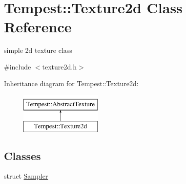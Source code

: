 \hypertarget{class_tempest_1_1_texture2d}{\section{Tempest\+:\+:Texture2d Class Reference}
\label{class_tempest_1_1_texture2d}
}


simple 2d texture class  




{\ttfamily \#include $<$texture2d.\+h$>$}

Inheritance diagram for Tempest\+:\+:Texture2d\+:\begin{figure}[H]
\begin{center}
\leavevmode
\includegraphics[height=2.000000cm]{class_tempest_1_1_texture2d}
\end{center}
\end{figure}
\subsection*{Classes}
\begin{DoxyCompactItemize}
\item 
struct \hyperlink{struct_tempest_1_1_texture2d_1_1_sampler}{Sampler}
\end{DoxyCompactItemize}
